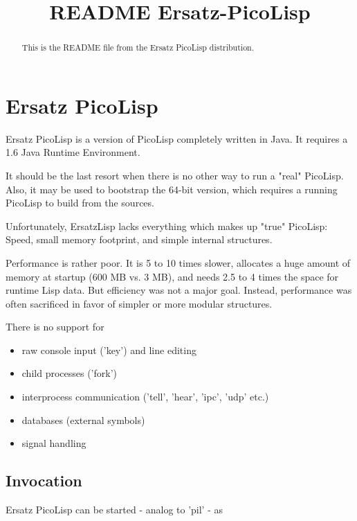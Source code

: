 \title{README Ersatz-PicoLisp}

\maketitle

\begin{abstract}
  This is the README file from the Ersatz PicoLisp distribution. 
\end{abstract}

\section{Ersatz PicoLisp}
\label{sec:ersatz-picolisp}

Ersatz PicoLisp is a version of PicoLisp completely written in Java.
It requires a 1.6 Java Runtime Environment.

It should be the last resort when there is no other way to run a
"real" PicoLisp. Also, it may be used to bootstrap the 64-bit version,
which requires a running PicoLisp to build from the sources.

Unfortunately, ErsatzLisp lacks everything which makes up "true"
PicoLisp: Speed, small memory footprint, and simple internal
structures.

Performance is rather poor. It is 5 to 10 times slower, allocates a
huge amount of memory at startup (600 MB vs. 3 MB), and needs 2.5 to 4
times the space for runtime Lisp data. But efficiency was not a major
goal. Instead, performance was often sacrificed in favor of simpler or
more modular structures.

There is no support for

\begin{itemize}
\item raw console input ('key') and line editing
\item child processes ('fork')
\item interprocess communication ('tell', 'hear', 'ipc', 'udp' etc.)
\item databases (external symbols)
\item signal handling
\end{itemize}


\subsection{Invocation}
\label{sec:invocation}

Ersatz PicoLisp can be started - analog to 'pil' - as

